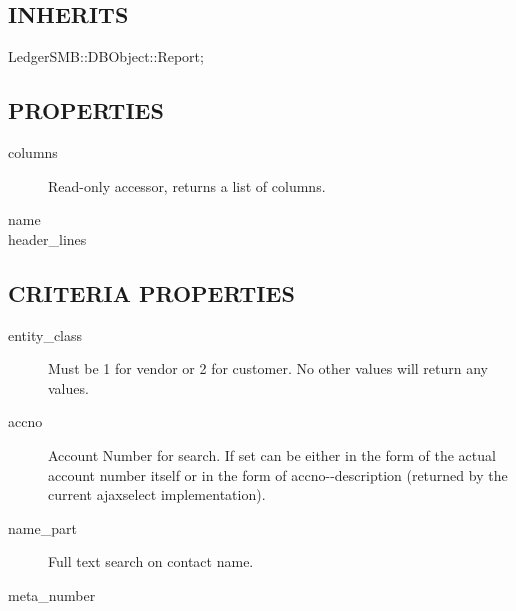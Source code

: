 \begin{description}
\begin{description}
\begin{description}
\begin{description}
\begin{description}
\begin{description}
\begin{description}
\begin{description}
\begin{description}
\begin{description}
\subsection*{INHERITS\label{LedgerSMB::DBObject::Report::Contact::Purchase_INHERITS}}
\begin{description}

\item[{LedgerSMB::DBObject::Report;}] \mbox{}\end{description}
\subsection*{PROPERTIES\label{LedgerSMB::DBObject::Report::Contact::Purchase_PROPERTIES}}
\begin{description}

\item[{columns}] \mbox{}

Read-only accessor, returns a list of columns.


\item[{name}] \mbox{}
\item[{header\_lines}] \mbox{}\end{description}
\subsection*{CRITERIA PROPERTIES\label{LedgerSMB::DBObject::Report::Contact::Purchase_CRITERIA_PROPERTIES}}
\begin{description}

\item[{entity\_class}] \mbox{}

Must be 1 for vendor or 2 for customer.  No other values will return any values.


\item[{accno}] \mbox{}

Account Number for search.  If set can be either in the form of the actual 
account number itself or in the form of accno-{}-description (returned by the
current ajaxselect implementation).


\item[{name\_part}] \mbox{}

Full text search on contact name.


\item[{meta\_number}] \mbox{}


\end{description}
\end{description}
\end{description}
\end{description}
\end{description}
\end{description}
\end{description}
\end{description}
\end{description}
\end{description}
\end{description}
